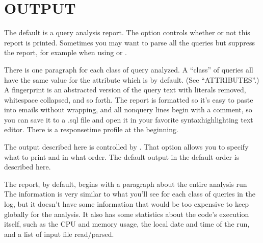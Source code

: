 \documentclass[letterpaper,10pt,english]{sphinxmanual}
\begin{document}
\section{OUTPUT}
\label{\detokenize{mariadb-query-digest:output}}
The default {\hyperref[\detokenize{mariadb-query-digest:cmdoption-mariadb-query-digest-output}]{}} is a query analysis report.  The 
option controls whether or not this report is printed.  Sometimes you may
want to parse all the queries but suppress the report, for example when using
{\hyperref[\detokenize{mariadb-query-digest:cmdoption-mariadb-query-digest-review}]{}} or {\hyperref[\detokenize{mariadb-query-digest:cmdoption-mariadb-query-digest-history}]{}}.

There is one paragraph for each class of query analyzed.  A “class” of queries
all have the same value for the {\hyperref[\detokenize{mariadb-query-digest:cmdoption-mariadb-query-digest-group-by}]{}} attribute which is
 by default.  (See “ATTRIBUTES”.)  A fingerprint is an
abstracted version of the query text with literals removed, whitespace
collapsed, and so forth.  The report is formatted so it’s easy to paste into
emails without wrapping, and all non\sphinxhyphen{}query lines begin with a comment, so you
can save it to a .sql file and open it in your favorite syntax\sphinxhyphen{}highlighting
text editor.  There is a response\sphinxhyphen{}time profile at the beginning.

The output described here is controlled by {\hyperref[\detokenize{mariadb-query-digest:cmdoption-mariadb-query-digest-report-format}]{}}.
That option allows you to specify what to print and in what order.
The default output in the default order is described here.

The report, by default, begins with a paragraph about the entire analysis run
The information is very similar to what you’ll see for each class of queries in
the log, but it doesn’t have some information that would be too expensive to
keep globally for the analysis.  It also has some statistics about the code’s
execution itself, such as the CPU and memory usage, the local date and time
of the run, and a list of input file read/parsed.
\end{document}

